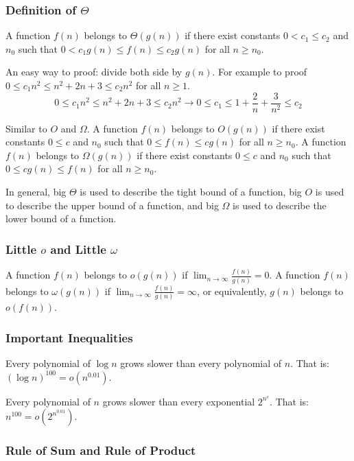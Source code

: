 \documentclass[a4paper,12pt]{article}
\begin{document}
\subsubsection{Definition of $\Theta$}

A function $f(n)$ belongs to $\Theta(g(n))$ if there exist constants $0 < c_1 \leq c_2$ and $n_0$ such that $0 < c_1 g(n) \leq f(n) \leq c_2 g(n)$ for all $n \geq n_0$.

An easy way to proof: divide both side by $g(n)$.
For example to proof $0 \leq c_1 n^2 \leq n^2 + 2n + 3 \leq c_2 n^2$ for all $n \geq 1$.
\begin{equation*}
	0 \leq c_1 n^2 \leq n^2 + 2n + 3 \leq c_2 n^2 \rightarrow 0 \leq c_1 \leq 1 + \frac{2}{n} + \frac{3}{n^2} \leq c_2 
\end{equation*}

Similar to $O$ and $\Omega$.
A function $f(n)$ belongs to $O(g(n))$ if there exist constants $0 \leq c$ and $n_0$ such that $0 \leq f(n) \leq c g(n)$ for all $n \geq n_0$.
A function $f(n)$ belongs to $\Omega(g(n))$ if there exist constants $0 \leq c$ and $n_0$ such that $0 \leq c g(n) \leq f(n)$ for all $n \geq n_0$.

In general, big $\Theta$ is used to describe the tight bound of a function, big $O$ is used to describe the upper bound of a function, and big $\Omega$ is used to describe the lower bound of a function.

\subsubsection{Little $o$ and Little $\omega$}

A function $f(n)$ belongs to $o(g(n))$ if $\lim_{n \to \infty} \frac{f(n)}{g(n)} = 0$.
A function $f(n)$ belongs to $\omega(g(n))$ if $\lim_{n \to \infty} \frac{f(n)}{g(n)} = \infty$, or equivalently, $g(n)$ belongs to $o(f(n))$.

\subsubsection{Important Inequalities}

Every polynomial of $\log n$ grows slower than every polynomial of $n$.
That is: $(\log n)^{100} = o(n^{0.01})$.

Every polynomial of $n$ grows slower than every exponential $2^{n^c}$.
That is: $n^{100} = o(2^{n^{0.01}})$.

\subsubsection{Rule of Sum and Rule of Product}
\end{document}
